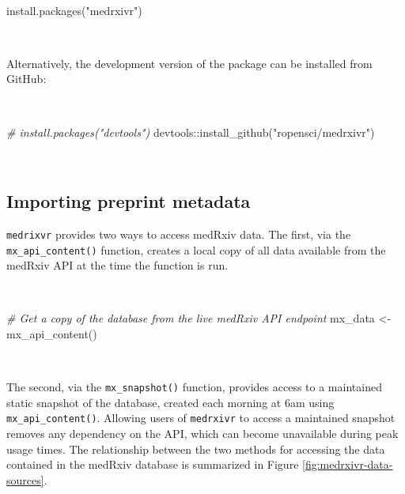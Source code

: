 \documentclass[a4paper, twoside]{templates/ociamthesis}
\newenvironment{Shaded}{\begin{snugshade}}{\end{snugshade}}
\newcommand{\CommentTok}[1]{\textcolor[rgb]{0.56,0.35,0.01}{\textit{#1}}}
\newcommand{\FunctionTok}[1]{\textcolor[rgb]{0.00,0.00,0.00}{#1}}
\newcommand{\NormalTok}[1]{#1}
\newcommand{\OtherTok}[1]{\textcolor[rgb]{0.56,0.35,0.01}{#1}}
\newcommand{\SpecialCharTok}[1]{\textcolor[rgb]{0.00,0.00,0.00}{#1}}
\newcommand{\StringTok}[1]{\textcolor[rgb]{0.31,0.60,0.02}{#1}}
\renewenvironment{Shaded}
{
  \vspace{4pt}%
  \begin{snugshade}%
}{%
  \end{snugshade}%
  \vspace{4pt}%
}
\begin{document}
~

\begin{Shaded}
\begin{Highlighting}[]
\FunctionTok{install.packages}\NormalTok{(}\StringTok{"medrxivr"}\NormalTok{)}
\end{Highlighting}
\end{Shaded}

~

Alternatively, the development version of the package can be installed from GitHub:

~

\begin{Shaded}
\begin{Highlighting}[]
\CommentTok{\# install.packages("devtools") }
\NormalTok{devtools}\SpecialCharTok{::}\FunctionTok{install\_github}\NormalTok{(}\StringTok{"ropensci/medrxivr"}\NormalTok{)}
\end{Highlighting}
\end{Shaded}

~

\hypertarget{importing-preprint-metadata}{%
\subsection{Importing preprint metadata}\label{importing-preprint-metadata}}

\texttt{medrixvr} provides two ways to access medRxiv data. The first, via the \texttt{mx\_api\_content()} function, creates a local copy of all data available from the medRxiv API at the time the function is run.

~

\begin{Shaded}
\begin{Highlighting}[]
\CommentTok{\# Get a copy of the database from the live medRxiv API endpoint}
\NormalTok{mx\_data }\OtherTok{\textless{}{-}} \FunctionTok{mx\_api\_content}\NormalTok{()  }
\end{Highlighting}
\end{Shaded}

~

The second, via the \texttt{mx\_snapshot()} function, provides access to a maintained static snapshot of the database, created each morning at 6am using \texttt{mx\_api\_content()}. Allowing users of \texttt{medrxivr} to access a maintained snapshot removes any dependency on the API, which can become unavailable during peak usage times. The relationship between the two methods for accessing the data contained in the medRxiv database is summarized in Figure \ref{fig:medrxivr-data-sources}.
\end{document}
